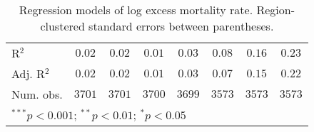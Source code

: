 \begin{table}
\begin{center}
\begin{tabular}{l c c c c c c c}
\hline
R$^2$          & $0.02$       & $0.02$       & $0.01$       & $0.03$       & $0.08$        & $0.16$        & $0.23$        \\
Adj. R$^2$     & $0.02$       & $0.02$       & $0.01$       & $0.03$       & $0.07$        & $0.15$        & $0.22$        \\
Num. obs.      & $3701$       & $3701$       & $3700$       & $3699$       & $3573$        & $3573$        & $3573$        \\
\hline
\multicolumn{8}{l}{\scriptsize{$^{***}p<0.001$; $^{**}p<0.01$; $^{*}p<0.05$}}
\end{tabular}
\caption{Regression models of log excess mortality rate. Region-clustered standard errors between parentheses.}
\label{tab:basemodels}
\end{center}
\end{table}
